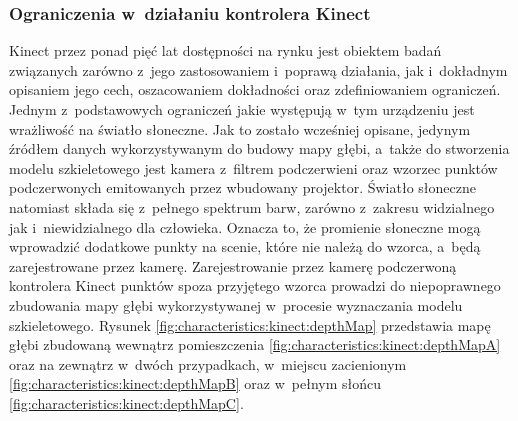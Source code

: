 \subsubsection*{Ograniczenia w~działaniu kontrolera Kinect}\label{ssec:characteristics:kinect:limitation}
																																	
Kinect przez ponad pięć lat dostępności na rynku jest obiektem badań związanych zarówno z~jego zastosowaniem i~poprawą działania, jak i~dokładnym opisaniem jego cech, oszacowaniem dokładności oraz zdefiniowaniem ograniczeń. Jednym z~podstawowych ograniczeń jakie występują w~tym urządzeniu jest wrażliwość na światło słoneczne. Jak to zostało wcześniej opisane, jedynym źródłem danych wykorzystywanym do budowy mapy głębi, a~także do stworzenia modelu szkieletowego jest kamera z~filtrem podczerwieni oraz wzorzec punktów podczerwonych emitowanych przez wbudowany projektor. Światło słoneczne natomiast składa się z~pełnego spektrum barw, zarówno z~zakresu widzialnego jak i~niewidzialnego dla człowieka. Oznacza to, że promienie słoneczne mogą wprowadzić dodatkowe punkty na scenie, które nie należą do wzorca, a~będą zarejestrowane przez kamerę. Zarejestrowanie przez kamerę podczerwoną kontrolera Kinect punktów spoza przyjętego wzorca prowadzi do niepoprawnego zbudowania mapy głębi wykorzystywanej w~procesie wyznaczania modelu szkieletowego. Rysunek \ref{fig:characteristics:kinect:depthMap} przedstawia mapę głębi zbudowaną wewnątrz pomieszczenia \ref{fig:characteristics:kinect:depthMapA} oraz na zewnątrz w~dwóch przypadkach, w~miejscu zacienionym \ref{fig:characteristics:kinect:depthMapB} oraz w~pełnym słońcu \ref{fig:characteristics:kinect:depthMapC}. 
																																	
